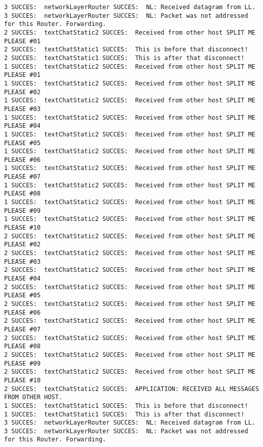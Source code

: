 \begin{lstlisting}[breaklines=true]
3 SUCCES:  networkLayerRouter SUCCES:  NL: Received datagram from LL.
3 SUCCES:  networkLayerRouter SUCCES:  NL: Packet was not addressed for this Router. Forwarding.
2 SUCCES:  textChatStatic2 SUCCES:  Received from other host SPLIT ME PLEASE #01
2 SUCCES:  textChatStatic1 SUCCES:  This is before that disconnect!
2 SUCCES:  textChatStatic1 SUCCES:  This is after that disconnect!
1 SUCCES:  textChatStatic2 SUCCES:  Received from other host SPLIT ME PLEASE #01
1 SUCCES:  textChatStatic2 SUCCES:  Received from other host SPLIT ME PLEASE #02
1 SUCCES:  textChatStatic2 SUCCES:  Received from other host SPLIT ME PLEASE #03
1 SUCCES:  textChatStatic2 SUCCES:  Received from other host SPLIT ME PLEASE #04
1 SUCCES:  textChatStatic2 SUCCES:  Received from other host SPLIT ME PLEASE #05
1 SUCCES:  textChatStatic2 SUCCES:  Received from other host SPLIT ME PLEASE #06
1 SUCCES:  textChatStatic2 SUCCES:  Received from other host SPLIT ME PLEASE #07
1 SUCCES:  textChatStatic2 SUCCES:  Received from other host SPLIT ME PLEASE #08
1 SUCCES:  textChatStatic2 SUCCES:  Received from other host SPLIT ME PLEASE #09
1 SUCCES:  textChatStatic2 SUCCES:  Received from other host SPLIT ME PLEASE #10
2 SUCCES:  textChatStatic2 SUCCES:  Received from other host SPLIT ME PLEASE #02
2 SUCCES:  textChatStatic2 SUCCES:  Received from other host SPLIT ME PLEASE #03
2 SUCCES:  textChatStatic2 SUCCES:  Received from other host SPLIT ME PLEASE #04
2 SUCCES:  textChatStatic2 SUCCES:  Received from other host SPLIT ME PLEASE #05
2 SUCCES:  textChatStatic2 SUCCES:  Received from other host SPLIT ME PLEASE #06
2 SUCCES:  textChatStatic2 SUCCES:  Received from other host SPLIT ME PLEASE #07
2 SUCCES:  textChatStatic2 SUCCES:  Received from other host SPLIT ME PLEASE #08
2 SUCCES:  textChatStatic2 SUCCES:  Received from other host SPLIT ME PLEASE #09
2 SUCCES:  textChatStatic2 SUCCES:  Received from other host SPLIT ME PLEASE #10
2 SUCCES:  textChatStatic2 SUCCES:  APPLICATION: RECEIVED ALL MESSAGES FROM OTHER HOST.
1 SUCCES:  textChatStatic1 SUCCES:  This is before that disconnect!
1 SUCCES:  textChatStatic1 SUCCES:  This is after that disconnect!
3 SUCCES:  networkLayerRouter SUCCES:  NL: Received datagram from LL.
3 SUCCES:  networkLayerRouter SUCCES:  NL: Packet was not addressed for this Router. Forwarding.
\end{lstlisting}
